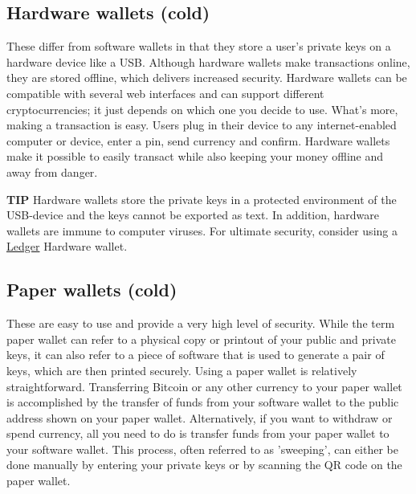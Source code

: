 \subsection{Hardware wallets (cold)} 
These differ from software wallets in that they store a user's private keys on a hardware device like a USB. Although hardware wallets make transactions online, they are stored offline, which delivers increased security. Hardware wallets can be compatible with several web interfaces and can support different cryptocurrencies; it just depends on which one you decide to use. What's more, making a transaction is easy. Users plug in their device to any internet-enabled computer or device, enter a pin, send currency and confirm. Hardware wallets make it possible to easily transact while also keeping your money offline and away from danger.

    \medskip
        \begin{tipbox}{\bf{TIP}}
        Hardware wallets store the private keys in a protected environment of the USB-device and the keys cannot be exported as text. In addition, hardware wallets are immune to computer viruses.
        \tcblower 
        For ultimate security, consider using a \href{https://shop.ledger.com/pages/ledger-nano-x?r=1849e3ffabd0}{Ledger} Hardware wallet.
    \end{tipbox}

\subsection{Paper wallets (cold)} 
These are easy to use and provide a very high level of security. While the term paper wallet can refer to a physical copy or printout of your public and private keys, it can also refer to a piece of software that is used to generate a pair of keys, which are then printed securely. Using a paper wallet is relatively straightforward. Transferring Bitcoin or any other currency to your paper wallet is accomplished by the transfer of funds from your software wallet to the public address shown on your paper wallet. Alternatively, if you want to withdraw or spend currency, all you need to do is transfer funds from your paper wallet to your software wallet. This process, often referred to as 'sweeping', can either be done manually by entering your private keys or by scanning the QR code on the paper wallet.

